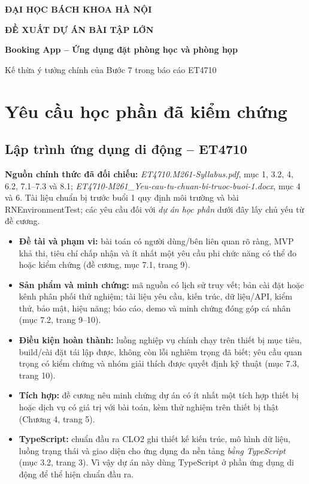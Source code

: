 \documentclass[12pt,a4paper]{article}
\begin{document}
\begin{center}
  {\large\bfseries ĐẠI HỌC BÁCH KHOA HÀ NỘI}\par
  \vspace{0.35cm}
  {\LARGE\bfseries\color{hustred} ĐỀ XUẤT DỰ ÁN BÀI TẬP LỚN}\par
  \vspace{0.12cm}
  {\large\bfseries Booking App -- Ứng dụng đặt phòng học và phòng họp}\par
  \vspace{0.15cm}
  {\normalsize Kế thừa ý tưởng chính của Bước 7 trong báo cáo ET4710}\par
\end{center}

\section{Yêu cầu học phần đã kiểm chứng}

\subsection{Lập trình ứng dụng di động -- ET4710}

\textbf{Nguồn chính thức đã đối chiếu:} \emph{ET4710.M261-Syllabus.pdf}, mục 1, 3.2, 4, 6.2, 7.1--7.3 và 8.1; \emph{ET4710-M261\_Yeu-cau-tu-chuan-bi-truoc-buoi-1.docx}, mục 4 và 6. Tài liệu chuẩn bị trước buổi 1 quy định môi trường và bài RNEnvironmentTest; các yêu cầu đối với \emph{dự án học phần} dưới đây lấy chủ yếu từ đề cương.

\begin{itemize}[leftmargin=1.6em,itemsep=2pt,topsep=2pt]
  \item \textbf{Đề tài và phạm vi:} bài toán có người dùng/bên liên quan rõ ràng, MVP khả thi, tiêu chí chấp nhận và ít nhất một yêu cầu phi chức năng có thể đo hoặc kiểm chứng (đề cương, mục 7.1, trang 9).
  \item \textbf{Sản phẩm và minh chứng:} mã nguồn có lịch sử truy vết; bản cài đặt hoặc kênh phân phối thử nghiệm; tài liệu yêu cầu, kiến trúc, dữ liệu/API, kiểm thử, bảo mật, hiệu năng; báo cáo, demo và minh chứng đóng góp cá nhân (mục 7.2, trang 9--10).
  \item \textbf{Điều kiện hoàn thành:} luồng nghiệp vụ chính chạy trên thiết bị mục tiêu, build/cài đặt tái lập được, không còn lỗi nghiêm trọng đã biết; yêu cầu quan trọng có kiểm chứng và nhóm giải thích được quyết định kỹ thuật (mục 7.3, trang 10).
  \item \textbf{Tích hợp:} đề cương nêu minh chứng dự án có ít nhất một tích hợp thiết bị hoặc dịch vụ có giá trị với bài toán, kèm thử nghiệm trên thiết bị thật (Chương 4, trang 5).
  \item \textbf{TypeScript:} chuẩn đầu ra CLO2 ghi thiết kế kiến trúc, mô hình dữ liệu, luồng trạng thái và giao diện cho ứng dụng đa nền tảng \emph{bằng TypeScript} (mục 3.2, trang 3). Vì vậy dự án này dùng TypeScript ở phần ứng dụng di động để thể hiện chuẩn đầu ra.
\end{itemize}
\end{document}
